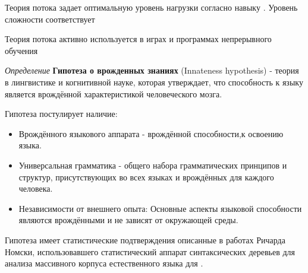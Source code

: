 Теория потока задает оптимальную уровень нагрузки согласно навыку \cite{csikszentmihalhi2020finding}. Уровень сложности соответствует

Теория потока активно используется в играх \cite{chen2007flow} и программах непрерывного обучения \cite{jarvis2009routledge}

\textit{Определение} \textbf{Гипотеза о врожденных знаниях} (Innateness hypothesis) - теория в лингвистике и когнитивной науке,
 которая утверждает, что способность к языку является врождённой характеристикой человеческого мозга. 

Гипотеза постулирует наличие:
\begin{itemize}
    \item Врождённого языкового аппарата - врождённой способности,к освоению языка.
    \item Универсальная грамматика - общего набора грамматических принципов и структур, присутствующих во всех языках и врождённых для каждого человека.
    \item Независимости от внешнего опыта: Основные аспекты языковой способности являются врождёнными и не зависят от окружающей среды.
\end{itemize}

Гипотеза имеет статистические подтверждения описанные в работах Ричарда Номски,
использовавшего статистический аппарат синтаксических деревьев для анализа массивного
корпуса естественного языка для  \cite{everaert2015structures}\cite{montague1970universal}.




